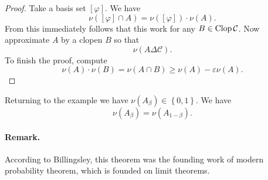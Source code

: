 
\begin{proof}
Take a basis set \( \left[ \varphi \right] \). We have
\[ 
    \nu \left( \left[ \varphi \right] \cap A \right) = \nu \left( \left[ \varphi \right] \right) \cdot \nu(A).
\]
From this immediately follows that this work for any \( B \in \operatorname{Clop} \mathcal{C} \).
Now approximate \( A \) by a clopen \( B \) so that
\[ 
    \nu \left( A \Delta \mathcal{C} \right).
\]
To finish the proof, compute
\[ 
    \nu(A) \cdot \nu(B) = \nu( A \cap B ) \geqslant \nu(A) -\varepsilon\nu(A). 
\]
\end{proof}

Returning to the example we have \( \nu(A_\beta) \in \left\{ 0,1 \right\} \). We have
\[ 
    \nu(A_\beta) = \nu (A_{1-\beta}).
\]


\paragraph{Remark.} According to Billingsley, this theorem was the founding work of modern probability theorem, which is founded on limit theorems.
